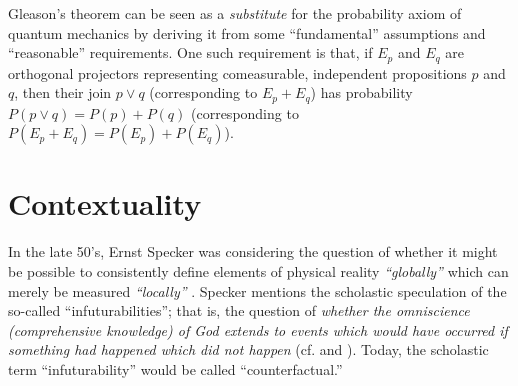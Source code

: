 \documentclass[%
  preprint,
 showpacs,
 showkeys,
 preprintnumbers,
 amsmath,amssymb,
 aps,
 rmp,
  longbibliography,
 ]{revtex4-1}
\begin{document}
Gleason's theorem can be seen as a {\it substitute} for the probability
axiom of quantum mechanics by deriving it from some ``fundamental''
assumptions and
``reasonable'' requirements.
One such requirement is that, if $E_p$ and
$E_q$ are orthogonal projectors representing comeasurable, independent
propositions $p$ and $q$, then their join $p\vee q$ (corresponding to
$E_p+E_q$) has probability
$P(p\vee q)=P(p)+P(q)$ (corresponding to
$P(E_p+E_q)=P(E_p)+P(E_q)$).


\section{Contextuality}

In the late 50's, Ernst Specker
was considering
the question of whether it might be possible to consistently define
elements of physical reality
 {\em ``globally''} which can merely be measured {\em
``locally''} \cite{specker-60}.
Specker mentions the scholastic
speculation of the
so-called ``infuturabilities''; that is, the question of {\em whether
the
omniscience (comprehensive knowledge) of God extends to events which
would have occurred if something  had happened which did not
happen}
(cf.
\cite[p. 243]{specker-60} and
\cite[p. 179]{specker-ges}).
Today, the scholastic term
``infuturability'' would be called ``counterfactual.''
\end{document}

